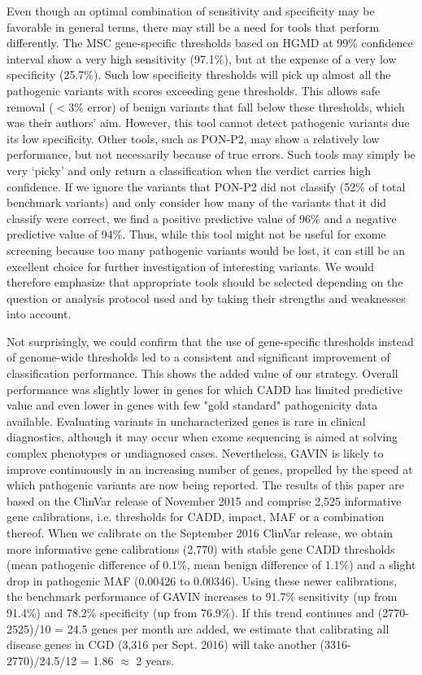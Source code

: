 Even though an optimal combination of sensitivity and specificity may be favorable in general terms, there may still be a need for tools that perform differently.
The MSC gene-specific thresholds based on HGMD\cite{Stenson_2013} at 99\% confidence interval show a very high sensitivity (97.1\%), but at the expense of a very low specificity (25.7\%).
Such low specificity thresholds will pick up almost all the pathogenic variants with scores exceeding gene thresholds.
This allows safe removal ($<$3\% error) of benign variants that fall below these thresholds, which was their authors’ aim.
However, this tool cannot detect pathogenic variants due its low specificity.
Other tools, such as PON-P2, may show a relatively low performance, but not necessarily because of true errors.
Such tools may simply be very ‘picky’ and only return a classification when the verdict carries high confidence.
If we ignore the variants that PON-P2 did not classify (52\% of total benchmark variants) and only consider how many of the variants that it did classify were correct, we find a positive predictive value of 96\% and a negative predictive value of 94\%.
Thus, while this tool might not be useful for exome screening because too many pathogenic variants would be lost, it can still be an excellent choice for further investigation of interesting variants.
We would therefore emphasize that appropriate tools should be selected depending on the question or analysis protocol used and by taking their strengths and weaknesses into account.

Not surprisingly, we could confirm that the use of gene-specific thresholds instead of genome-wide thresholds led to a consistent and significant improvement of classification performance.
This shows the added value of our strategy.
Overall performance was slightly lower in genes for which CADD has limited predictive value and even lower in genes with few "gold standard" pathogenicity data available.
Evaluating variants in uncharacterized genes is rare in clinical diagnostics, although it may occur when exome sequencing is aimed at solving complex phenotypes or undiagnosed cases.
Nevertheless, GAVIN is likely to improve continuously in an increasing number of genes, propelled by the speed at which pathogenic variants are now being reported.
The results of this paper are based on the ClinVar release of November 2015 and comprise 2,525 informative gene calibrations, i.e. thresholds for CADD, impact, MAF or a combination thereof.
When we calibrate on the September 2016 ClinVar release, we obtain more informative gene calibrations (2,770) with stable gene CADD thresholds (mean pathogenic difference of 0.1\%, mean benign difference of 1.1\%) and a slight drop in pathogenic MAF (0.00426 to 0.00346).
Using these newer calibrations, the benchmark performance of GAVIN increases to 91.7\% sensitivity (up from 91.4\%) and 78.2\% specificity (up from 76.9\%).
If this trend continues and (2770-2525)/10 = 24.5 genes per month are added, we estimate that calibrating all disease genes in CGD (3,316 per Sept. 2016) will take another (3316-2770)/24.5/12 = 1.86 $\approx$ 2 years.

